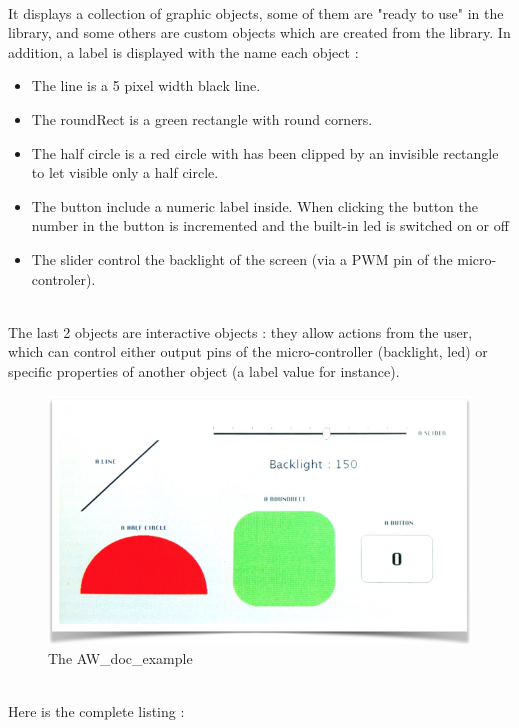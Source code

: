 \documentclass[a4paper,11pt]{extarticle}
\begin{document}
~\\It displays a collection of graphic objects, some of them are "ready to use" in the library, and some others are custom objects which are created from the library. In addition, a label is displayed with the name each object :

\begin{itemize}
  \item The line is a 5 pixel width black line.
  \item The roundRect is a green rectangle with round corners.
  \item The half circle is a red circle with has been clipped by an invisible rectangle to let visible only a half circle.
  \item The button include a numeric label inside. When clicking the button the number in the button is incremented and the built-in led is switched on or off
  \item The slider control the backlight of the screen (via a PWM pin of the micro-controler).
\end{itemize}

  ~\\ The last 2 objects are interactive objects : they allow actions from the user, which can control either output pins of the micro-controller (backlight, led) or specific properties of another object (a label value for instance).
  
\begin{figure}[htbp] %
   \centering
   \includegraphics[width=6in]{AWFig1.png} 
   \caption{The AW\_doc\_example }
   \label{fig:1 }
\end{figure}


~\\Here is the complete listing : 
\end{document}
